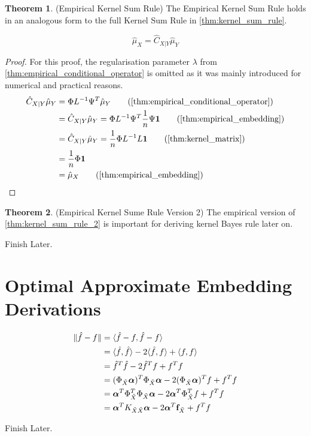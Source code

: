 \documentclass[twoside]{article} \usepackage{aistats2017}
\theoremstyle{definition}
\newtheorem{theorem}{Theorem}[section]
\newcommand{\rv}[1]{{#1}}
\newcommand{\ds}[1]{\tilde{#1}}
\newcommand{\warn}[1]{{\color{red} #1}}
\newcommand{\hatmuX}{\hat{\mu}_{\rv{X}}}
\newcommand{\hatmuY}{\hat{\mu}_{\rv{Y}}}
\newcommand{\hatCxly}{\hat{C}_{\rv{X} | \rv{Y}}}
\begin{document}
		\begin{theorem} \label{thm:empirical_kernel_sum_rule}
			(Empirical Kernel Sum Rule)
			The Empirical Kernel Sum Rule holds in an analogous form to the full Kernel Sum Rule in \cref{thm:kernel_sum_rule}.
			
			\begin{equation}
				\hatmuX = \hatCxly \hatmuY
			\label{eq:empirical_kernel_sum_rule}
			\end{equation}
			
			\begin{proof}
				For this proof, the regularisation parameter $\lambda$ from \cref{thm:empirical_conditional_operator} is omitted as it was mainly introduced for numerical and practical reasons.
				\begin{align*}
					\hatCxly \hatmuY &= \Phi L^{-1} \Psi^{T} \hatmuY \tag{\cref{thm:empirical_conditional_operator}} \\
					&= \hatCxly \hatmuY = \Phi L^{-1} \Psi^{T} \frac{1}{n} \Psi \bvec{1} \tag{\cref{thm:empirical_embedding}} \\
					&= \hatCxly \hatmuY =  \frac{1}{n} \Phi L^{-1} L \bvec{1} \tag{\cref{thm:kernel_matrix}} \\
					&=  \frac{1}{n} \Phi \bvec{1} \\
					&= \hatmuX \tag{\cref{thm:empirical_embedding}}
				\end{align*}
			\end{proof}
		\end{theorem}
		
		\begin{theorem} \label{thm:empirical_kernel_sum_rule_2}
			(Empirical Kernel Sume Rule Version 2) The empirical version of \cref{thm:kernel_sum_rule_2} is important for deriving kernel Bayes rule later on.
		\end{theorem}
		\warn{Finish Later.}

\section{Optimal Approximate Embedding Derivations}

		\begin{equation}
		\begin{aligned}
			\Vert \hat{f} - f \Vert &= \langle \hat{f} - f, \hat{f} - f \rangle \\
			&= \langle \hat{f}, \hat{f} \rangle - 2 \langle \hat{f}, f \rangle + \langle f, f \rangle \\
			&=  \hat{f}^{T} \hat{f} - 2 \hat{f}^{T} f + f^{T} f \\
			&= (\Phi_{\ds{X}} \bm{\alpha})^{T} \Phi_{\ds{X}}  \bm{\alpha} - 2 (\Phi_{\ds{X}}  \bm{\alpha})^{T} f + f^{T} f \\
			&= \bm{\alpha}^{T} \Phi_{\ds{X}} ^{T} \Phi_{\ds{X}}  \bm{\alpha} - 2 \bm{\alpha}^{T} \Phi_{\ds{X}} ^{T} f + f^{T} f \\
			&= \bm{\alpha}^{T} K_{\ds{X} \ds{X}}  \bm{\alpha} - 2 \bm{\alpha}^{T} \bvec{f}_{\ds{X}} + f^{T} f \\
			\end{aligned}
		\label{eq:approximate_embedding_derivation}
		\end{equation}
		
		\warn{Finish Later.}
\end{document}
